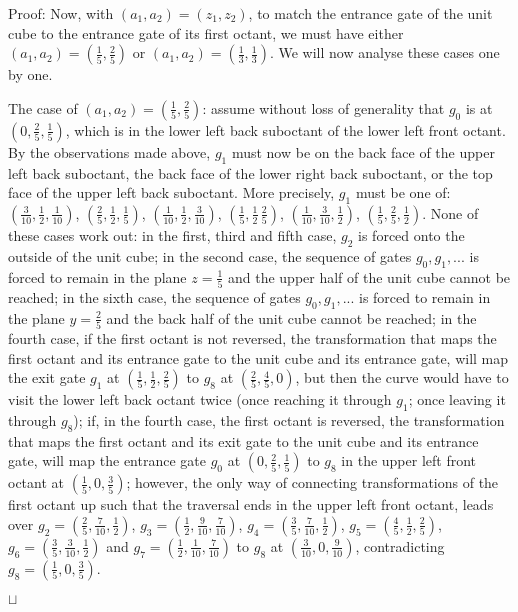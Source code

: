 \documentclass[11pt,a4paper]{article}
\newenvironment{proof}{Proof:}{\qed}
\def\squareforqed{\hbox{\rlap{$\sqcap$}$\sqcup$}}
\def\qed{\ifmmode\squareforqed\else{\unskip\nobreak\hfil
\penalty50\hskip1em\null\nobreak\hfil\squareforqed
\parfillskip=0pt\finalhyphendemerits=0\endgraf}\fi}
\begin{document}
\begin{proof}
Now, with $(a_1,a_2) = (z_1,z_2)$, to match the entrance gate of the unit cube to the entrance gate of its first octant, we must have either $(a_1,a_2) = (\frac15,\frac25)$ or $(a_1,a_2) = (\frac13,\frac13)$. We will now analyse these cases one by one.

The case of $(a_1,a_2) = (\frac15,\frac25)$: assume without loss of generality that $g_0$ is at $(0,\frac25, \frac15)$, which is in the lower left back suboctant of the lower left front octant. By the observations made above, $g_1$ must now be on the back face of the upper left back suboctant, the back face of the lower right back suboctant, or the top face of the upper left back suboctant. More precisely, $g_1$ must be one of: $(\frac3{10},\frac12,\frac1{10})$, $(\frac25,\frac12,\frac15)$, $(\frac1{10},\frac12,\frac3{10})$, $(\frac15,\frac12\,\frac25)$, $(\frac1{10},\frac3{10},\frac12)$, $(\frac15,\frac25,\frac12)$. None of these cases work out: in the first, third and fifth case, $g_2$ is forced onto the outside of the unit cube; in the second case, the sequence of gates $g_0, g_1, ...$ is forced to remain in the plane $z = \frac15$ and the upper half of the unit cube cannot be reached; in the sixth case, the sequence of gates $g_0, g_1, ...$ is forced to remain in the plane $y = \frac25$ and the back half of the unit cube cannot be reached; in the fourth case, if the first octant is not reversed, the transformation that maps the first octant and its entrance gate to the unit cube and its entrance gate, will map the exit gate $g_1$ at $(\frac15,\frac12,\frac25)$ to $g_8$ at $(\frac25,\frac45,0)$, but then the curve would have to visit the lower left back octant twice (once reaching it through $g_1$; once leaving it through $g_8$); if, in the fourth case, the first octant is reversed, the transformation that maps the first octant and its exit gate to the unit cube and its entrance gate, will map the entrance gate $g_0$ at $(0,\frac25,\frac15)$ to $g_8$ in the upper left front octant at $(\frac15,0,\frac35)$; however, the only way of connecting transformations of the first octant up such that the traversal ends in the upper left front octant, leads over $g_2 = (\frac25,\frac7{10},\frac12)$, $g_3 = (\frac12,\frac9{10},\frac7{10})$, $g_4 = (\frac35,\frac7{10},\frac12)$, $g_5 = (\frac45, \frac12, \frac25)$, $g_6 = (\frac35,\frac3{10},\frac12)$ and $g_7 = (\frac12,\frac1{10},\frac7{10})$ to $g_8$ at $(\frac3{10},0,\frac9{10})$, contradicting $g_8 = (\frac15,0,\frac35)$.


\end{proof}
\end{document}
